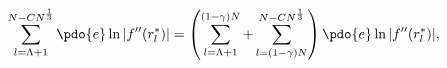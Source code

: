 \begin{equation}
\label{Eq_A17}
\sum^{N-CN^{\frac{1}{3}}}_{l=\Lambda+1}
  \pdo{e} \ln|f''(r^{*}_l)|
  = \left(
  \sum^{(1 - \gamma)N}_{l=\Lambda+1}
  + \sum^{N-CN^{\frac{1}{3}}}_{l=(1-\gamma)N}
  \right)
  \pdo{e} \ln |f''(r^{*}_l)|,
\end{equation}

